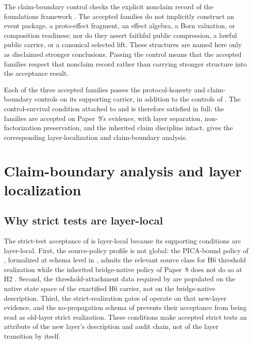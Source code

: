 \documentclass[11pt]{article}
\newcommand{\OldLayer}{H2}
\newcommand{\NewLayer}{H6}
\newcommand{\PaperNine}{Paper~9}
\newcommand{\PaperEight}{Paper~8}
\theoremstyle{definition}
\begin{document}
The claim-boundary control checks the explicit nonclaim record of the
foundations framework \cite{Tsiokos2026FoundationsII}.  The accepted families do
not implicitly construct an event package, a proto-effect fragment, an effect
algebra, a Born valuation, or composition readiness; nor do they assert
faithful public compression, a lawful public carrier, or a canonical selected
lift.  These structures are named here only as disclaimed stronger conclusions.
Passing the control means that the accepted families respect that nonclaim
record rather than carrying stronger structure into the acceptance result.

Each of the three accepted families passes the protocol-honesty and
claim-boundary controls on its supporting carrier, in addition to the controls
of .
The control-survival condition attached to
 and
 is therefore satisfied in full: the
families are accepted on \PaperNine{}'s evidence, with layer separation,
non-factorization preservation, and the inherited claim discipline intact.
 gives the corresponding layer-localization and
claim-boundary analysis.
 \section{Claim-boundary analysis and layer localization}\label{sec:analysis}

\subsection{Why strict tests are layer-local}\label{subsec:strict-tests-layer-local}

The strict-test acceptance of  is layer-local because
its supporting conditions are layer-local.  First, the source-policy profile is
not global: the PICA-bound policy of
, formalized at schema level in
, admits the relevant source class
for \NewLayer{} threshold realization while the inherited bridge-native policy
of \PaperEight{} does not do so at \OldLayer{}
\cite{Tsiokos2026CarrierToEvent,Tsiokos2026FoundationsII}.  Second, the
threshold-attachment data required by
 are populated on the native
state space of the exactified \NewLayer{} carrier, not on the bridge-native
description.  Third, the strict-realization gates of 
operate on that new-layer evidence, and the no-propagation schema of
 prevents their acceptance from being
read as old-layer strict realization.  These conditions make accepted strict
tests an attribute of the new layer's description and audit chain, not of the
layer transition by itself.
\end{document}
